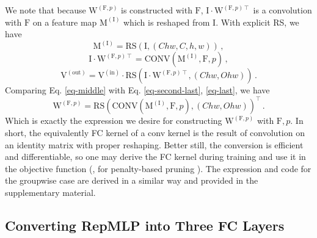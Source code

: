 \documentclass[10pt,twocolumn,letterpaper]{article}
\begin{document}
We note that because $\mathrm{W}^{(\mathrm{F},p)}$ is constructed with $\mathrm{F}$, $\mathrm{I} \cdot \mathrm{W}^{(\mathrm{F},p)\intercal}$ is a convolution with $\mathrm{F}$ on a feature map $\mathrm{M}^{(\mathrm{I})}$ which is reshaped from $\mathrm{I}$. With explicit RS, we have
\begin{equation}
	\mathrm{M}^{(\mathrm{I})} = \text{RS}(\mathrm{I}, (Chw, C, h, w)) \,,
\end{equation}
\begin{equation}\label{eq-second-last}
	\mathrm{I}\cdot\mathrm{W}^{(\mathrm{F},p)\intercal} = \text{CONV}(\mathrm{M}^{(\mathrm{I})}, \mathrm{F}, p) \,,
\end{equation}
\begin{equation}\label{eq-last}
	\mathrm{V}^{(\text{out})} = \mathrm{V}^{(\text{in})} \cdot \text{RS}(\mathrm{I}\cdot\mathrm{W}^{(\mathrm{F},p)\intercal}, (Chw, Ohw)) \,.
\end{equation}
Comparing Eq. \ref{eq-middle} with Eq. \ref{eq-second-last}, \ref{eq-last}, we have
\begin{equation}\label{eq-final}
	\mathrm{W}^{(\mathrm{F},p)} = \text{RS}(\text{CONV}(\mathrm{M}^{(\mathrm{I})}, \mathrm{F}, p), (Chw, Ohw))^\intercal \,.
\end{equation}
Which is exactly the expression we desire for constructing $\mathrm{W}^{(\mathrm{F},p)}$ with $\mathrm{F}, p$. In short, the equivalently FC kernel of a conv kernel is the result of convolution on an identity matrix with proper reshaping. Better still, the conversion is efficient and differentiable, so one may derive the FC kernel during training and use it in the objective function (\eg, for penalty-based pruning \cite{han2015learning,molchanov2016pruning}). The expression and code for the groupwise case are derived in a similar way and provided in the supplementary material.


\subsection{Converting RepMLP into Three FC Layers}
\end{document}

